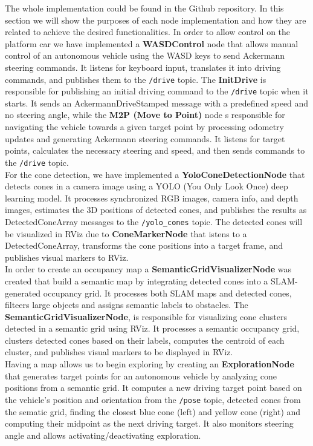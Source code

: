 The whole implementation could be found in the Github repository. In this section we will show the purposes of each node implementation and how they are related to achieve the desired functionalities.
In order to allow control on the platform car we have implemented a \textbf{WASDControl} node that allows manual control of an autonomous vehicle using the WASD keys to send Ackermann steering commands. It listens for keyboard input, translates it into driving commands, and publishes them to the \texttt{/drive} topic.
The \textbf{InitDrive} is responsible for publishing an initial driving command to the \texttt{/drive} topic when it starts. It sends an AckermannDriveStamped message with a predefined speed and no steering angle, while the \textbf{M2P (Move to Point)} node s responsible for navigating the vehicle towards a given target point by processing odometry updates and generating Ackermann steering commands. It listens for target points, calculates the necessary steering and speed, and then sends commands to the \texttt{/drive} topic.\\
\newline
For the cone detection, we have implemented a \textbf{YoloConeDetectionNode} that detects cones in a camera image using a YOLO (You Only Look Once) deep learning model. It processes synchronized RGB images, camera info, and depth images, estimates the 3D positions of detected cones, and publishes the results as DetectedConeArray messages to the \texttt{/yolo\_cones} topic.
The detected cones will be visualized in RViz due to \textbf{ConeMarkerNode} that istens to a DetectedConeArray, transforms the cone positions into a target frame, and publishes visual markers to RViz.\\
\newline
In order to create an occupancy map a \textbf{SemanticGridVisualizerNode} was created that build a semantic map by integrating detected cones into a SLAM-generated occupancy grid. It processes both SLAM maps and detected cones, filteers large objects and assigns semantic labels to obstacles.
The \textbf{SemanticGridVisualizerNode}, is responsible for visualizing cone clusters detected in a semantic grid using RViz. It processes a semantic occupancy grid, clusters detected cones based on their labels, computes the centroid of each cluster, and publishes visual markers to be displayed in RViz.\\
\newline
Having a map allows us to begin exploring by creating an \textbf{ExplorationNode} that generates target points for an autonomous vehicle by analyzing cone positions from a semantic grid. It computes a new driving target point based on the vehicle's position and orientation from the \texttt{/pose} topic, detected cones from the sematic grid, finding the closest blue cone (left) and yellow cone (right) and computing their midpoint as the next driving target. It also monitors steering angle and allows activating/deactivating exploration.

